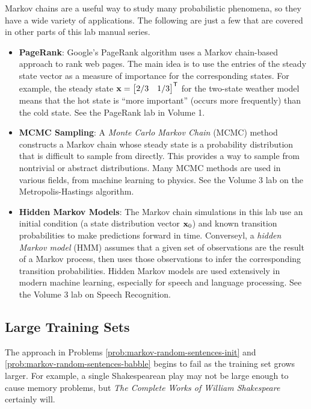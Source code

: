 Markov chains are a useful way to study many probabilistic phenomena, so they have a wide variety of applications.
The following are just a few that are covered in other parts of this lab manual series.
\begin{itemize}
\item \textbf{PageRank}: Google's PageRank algorithm uses a Markov chain-based approach to rank web pages.
The main idea is to use the entries of the steady state vector as a measure of importance for the corresponding states.
For example, the steady state $\mathbf{x} = \begin{bmatrix}2/3 & 1/3\end{bmatrix}^{\mathsf T}$ for the two-state weather model means that the hot state is ``more important'' (occurs more frequently) than the cold state.
See the PageRank lab in Volume 1.

\item \textbf{MCMC Sampling}: A \emph{Monte Carlo Markov Chain} (MCMC) method constructs a Markov chain whose steady state is a probability distribution that is difficult to sample from directly.
This provides a way to sample from nontrivial or abstract distributions.
Many MCMC methods are used in various fields, from machine learning to physics.
See the Volume 3 lab on the Metropolis-Hastings algorithm.

\item \textbf{Hidden Markov Models}: The Markov chain simulations in this lab use an initial condition (a state distribution vector $\mathbf{x}_0$) and known transition probabilities to make predictions forward in time.
Converseyl, a \emph{hidden Markov model} (HMM) assumes that a given set of observations are the result of a Markov process, then uses those observations to infer the corresponding transition probabilities.
Hidden Markov models are used extensively in modern machine learning, especially for speech and language processing.
See the Volume 3 lab on Speech Recognition.
\end{itemize}

\subsection*{Large Training Sets} %

The approach in Problems \ref{prob:markov-random-sentences-init} and \ref{prob:markov-random-sentences-babble} begins to fail as the training set grows larger.
For example, a single Shakespearean play may not be large enough to cause memory problems, but \emph{The Complete Works of William Shakespeare} certainly will.

